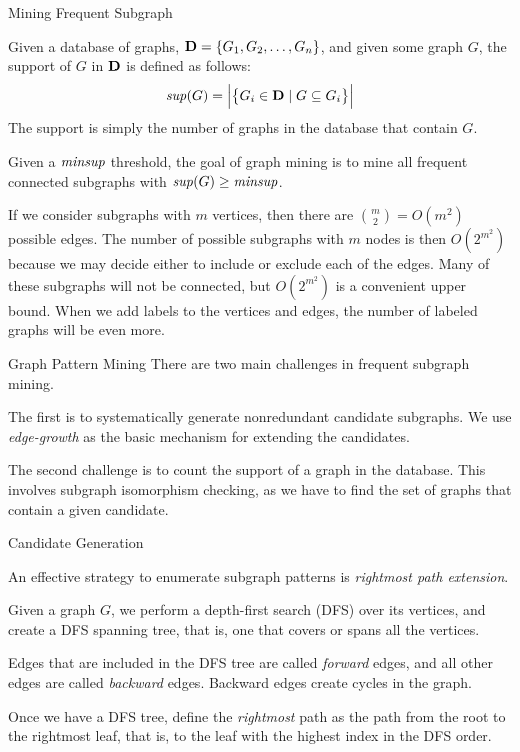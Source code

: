 \begin{frame}{Mining Frequent Subgraph}

Given a database of graphs, $\mathbf{D} = \{
G_1, G_2, \ldots, G_n\}$, and given some graph $G$, the support of
$G$ in $\mathbf{D}$ is def\/{i}ned as follows:
\begin{align*}
    \mathit{sup}(G) = \Big| \bigl\{ G_i \in \mathbf{D} \mid
    G \subseteq G_i\bigr\} \Big|
\end{align*}
The support is simply the number of graphs in the database that
contain $G$. 

Given a $\mathit{minsup}$ threshold, the goal of graph
mining is to mine all frequent connected subgraphs
with $\mathit{sup}(G) \ge \mathit{minsup}$.

\bigskip
If we consider subgraphs with $m$ vertices, then there are ${m \choose 2} =
O(m^2)$ possible edges. The number of possible subgraphs with $m$ nodes
is then $O(2^{m^2})$ because we may decide either to include or exclude
each of the edges.  Many of these subgraphs will not be connected, but
$O(2^{m^2})$ is a convenient upper bound.  When we add labels to the vertices
and edges, the number of labeled graphs will be even more. 
\end{frame}


\begin{frame}{Graph Pattern Mining}
There are two main challenges in frequent subgraph mining. 


\bigskip
The f\/{i}rst is
to systematically generate nonredundant candidate subgraphs. We use {\em edge-growth}
as the basic mechanism for extending
the candidates. 

\bigskip
The second challenge is to count the support of a graph in the
database. This involves subgraph isomorphism checking, as we have to
f\/{i}nd the set of graphs that contain a given candidate.
\end{frame}


\begin{frame}{Candidate Generation}

An effective strategy to enumerate subgraph patterns is
{\em rightmost path extension}.

\medskip
Given a graph $G$, we perform a
depth-f\/{i}rst search (DFS) over its vertices, and create a DFS spanning
tree, that is, one that covers or spans all the vertices.

\medskip
Edges that are included in the DFS tree are called
{\em forward} edges, and all other edges are called {\em backward}
edges. Backward edges create cycles in the graph.

\medskip
Once we have a DFS tree, def\/{i}ne the {\em rightmost} path as the
path from the root to the rightmost leaf,
that is, to the leaf with the
highest index in the DFS order.
\end{frame}


